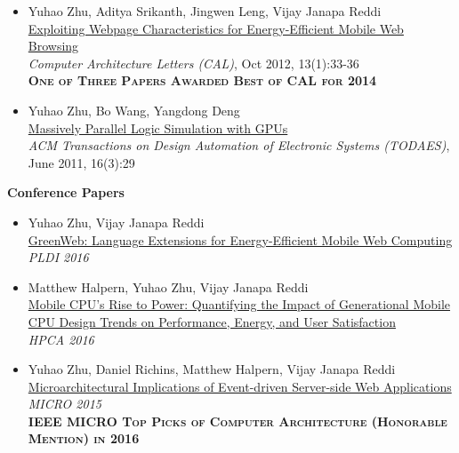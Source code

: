 \documentclass[margin, 9pt]{res} %
\begin{document}
\begin{resume}
\begin{itemize}[leftmargin=*]
	\item Yuhao Zhu, Aditya Srikanth, Jingwen Leng, Vijay Janapa Reddi\\[2pt]
          \href{http://yuhaozhu.com/pubs/cal12.pdf}{Exploiting Webpage Characteristics for Energy-Efficient Mobile Web Browsing}\\
          \textit{Computer Architecture Letters (CAL)}, Oct 2012, 13(1):33-36\\
          \textbf{\textsc{One of Three Papers Awarded Best of CAL for 2014}}

	\item Yuhao Zhu, Bo Wang, Yangdong Deng\\[2pt]
          \href{http://yuhaozhu.com/pubs/todaes11.pdf}{Massively Parallel Logic Simulation with GPUs}\\
          \textit{ACM Transactions on Design Automation of Electronic Systems (TODAES)}, June 2011, 16(3):29
\end{itemize}

\vspace*{7pt}
{\large\textbf{Conference Papers}}

\begin{itemize}[leftmargin=*] \itemsep 0pt
	\item Yuhao Zhu, Vijay Janapa Reddi\\[2pt]
          {\href{http://yuhaozhu.com/pubs/pldi16.pdf}{GreenWeb: Language Extensions for Energy-Efficient Mobile Web Computing}}\\
          \textit{PLDI 2016}

	\item Matthew Halpern, Yuhao Zhu, Vijay Janapa Reddi\\[2pt]
          {\href{http://yuhaozhu.com/pubs/hpca16.pdf}{Mobile CPU's Rise to Power: Quantifying the Impact of Generational Mobile CPU Design Trends on Performance, Energy, and User Satisfaction}}\\
          \textit{HPCA 2016}

	\item Yuhao Zhu, Daniel Richins, Matthew Halpern, Vijay Janapa Reddi\\[2pt]
          \href{http://yuhaozhu.com/pubs/micro15.pdf}{Microarchitectural Implications of Event-driven Server-side Web Applications}\\
          \textit{MICRO 2015}\\
          \textbf{\textsc{IEEE MICRO Top Picks of Computer Architecture (Honorable Mention) in 2016}}


\end{itemize}
\end{resume}
\end{document}
